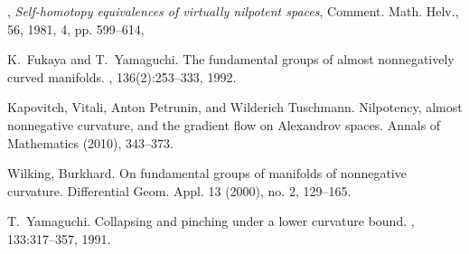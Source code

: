 \documentclass{amsart}
\begin{document}
\begin{thebibliography}{HMR75}
,
 \textit{Self-homotopy equivalences of virtually nilpotent spaces},
{Comment. Math. Helv.},
{56},
{1981},
{4},
pp. {599--614},

K.~Fukaya and T.~Yamaguchi.
\newblock The fundamental groups of almost nonnegatively curved manifolds.
, 136(2):253--333, 1992.


 Kapovitch, Vitali, Anton Petrunin, and Wilderich Tuschmann. 
\newblock Nilpotency, almost nonnegative curvature, and the gradient flow on Alexandrov spaces. 
\newblock Annals of Mathematics (2010), 343--373.

Wilking, Burkhard. \newblock On fundamental groups of manifolds of nonnegative curvature. \newblock  Differential Geom. Appl.  13  (2000),  no. 2, 129--165.

T.~Yamaguchi.
\newblock Collapsing and pinching under a lower curvature bound.
, 133:317--357, 1991.
\end{thebibliography}
\end{document}
